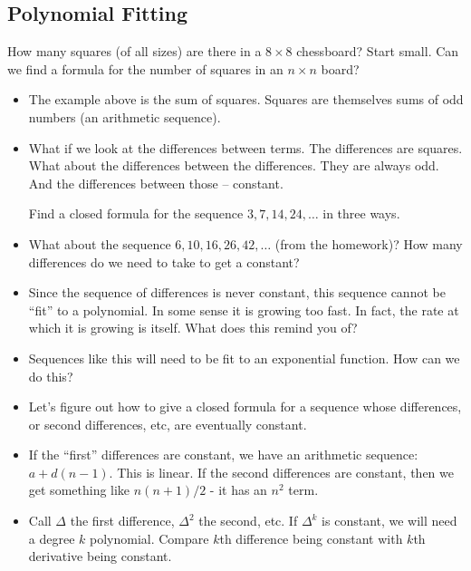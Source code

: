 \documentclass[12pt]{article}
\theoremstyle{plain}
\theoremstyle{definition}
\theoremstyle{remark}
\newcommand{\ex}{\noindent{\bf Ex: }}
\newcommand{\todayis}[1]{\clearpage{\rhead{\footnotesize #1}}}
\begin{document}
 \todayis{Wednesday, October 5}

 \subsection*{Polynomial Fitting}
 \ex How many squares (of all sizes) are there in a $8\times 8$ chessboard?  Start small.  Can we find a formula for the number of squares in an $n\times n$ board?
 \begin{itemize}
   \item The example above is the sum of squares.  Squares are themselves sums of odd numbers (an arithmetic sequence).

   \item What if we look at the differences between terms.  The differences are squares.  What about the differences between the differences.  They are always odd.  And the differences between those -- constant.



   \ex Find a closed formula for the sequence $3, 7, 14, 24,\ldots$ in three ways.

   \item What about the sequence $6, 10, 16, 26, 42, \ldots$ (from the homework)?  How many differences do we need to take to get a constant?

   \item Since the sequence of differences is never constant, this sequence cannot be ``fit'' to a polynomial.  In some sense it is growing too fast.  In fact, the rate at which it is growing is itself.  What does this remind you of?

   \item Sequences like this will need to be fit to an exponential function.  How can we do this?

   \item Let's figure out how to give a closed formula for a sequence whose differences, or second differences, etc, are eventually constant.

   \item If the ``first'' differences are constant, we have an arithmetic sequence: $a + d(n-1)$.  This is linear.  If the second differences are constant, then we get something like $n(n+1)/2$ - it has an $n^2$ term.

   \item Call $\Delta$ the first difference, $\Delta^2$ the second, etc.  If $\Delta^k$ is constant, we will need a degree $k$ polynomial.  Compare $k$th difference being constant with $k$th derivative being constant.


\end{itemize}
\end{document}
